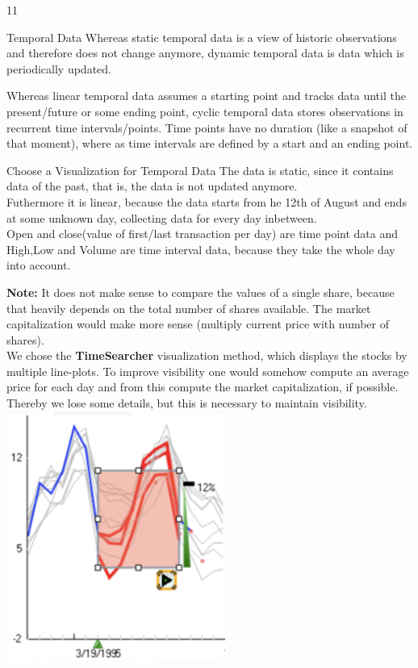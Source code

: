 \documentclass{article}
\begin{document}
    \begin{ukon-infie}[31.01.18]{11}

        \begin{exercise}[p=3]{Temporal Data}  
        \question{}
        {
        Whereas static temporal data is a view of historic observations and therefore does not change anymore, dynamic temporal data is data which is periodically updated.
      	}
      	
      	\question{}
      	{
      	Whereas linear temporal data assumes a starting point and tracks data until the present/future or some ending point, cyclic temporal data stores observations in recurrent time intervals/points.
      	}
      	\question{}
      	{
      	Time points have no duration (like a snapshot of that moment), where as time intervals are defined by a start and an ending point.
      	}
		\end{exercise}
		
		
		\begin{exercise}[p=7]{Choose a Visualization for Temporal Data}
		\question{}
		{
		The data is static, since it contains data of the past, that is, the data is not updated anymore.\\
		Futhermore it is linear, because the data starts from he 12th of August and ends at some unknown day, collecting data for every day inbetween.\\
		Open and close(value of first/last transaction per day) are time point data and High,Low and Volume are time interval data, because they take the whole day into account.
		}
		\question{}
		{
		
		\textbf{Note:} It does not make sense to compare the values of a single share, because that heavily depends on the total number of shares available. The market capitalization would make more sense (multiply current price with number of shares).\\
		
			We chose the \textbf{TimeSearcher} visualization method, which displays the stocks by multiple line-plots. To improve visibility one would somehow compute an average price for each day and from this compute the market capitalization, if possible. Thereby we lose some details, but this is necessary to maintain visibility.\\
			
						\includegraphics[scale=0.7]{time_searcher.png}
						
}
\end{exercise}
\end{ukon-infie}
\end{document}
